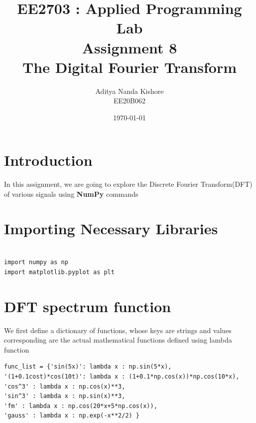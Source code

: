 \documentclass[12pt, a4paper]{report}
\title{\textbf{EE2703 : Applied Programming Lab \\ Assignment 8 \\ The Digital Fourier Transform}}
\author{Aditya Nanda Kishore\\ EE20B062}
\date{\today} %
\begin{document}
		
\maketitle
\section*{Introduction}
In this assignment, we are going to explore the Discrete Fourier Transform(DFT)  of various signals using \textbf{NumPy} commands
\section*{Importing Necessary Libraries}
\begin{Verbatim}

import numpy as np
import matplotlib.pyplot as plt 
\end{Verbatim}

\section*{DFT spectrum function}
We first define a dictionary of functions, whose keys are strings and values corresponding are the actual mathematical functions defined using lambda function

\begin{Verbatim}
func_list = {'sin(5x)': lambda x : np.sin(5*x),
'(1+0.1cost)*cos(10t)': lambda x : (1+0.1*np.cos(x))*np.cos(10*x), 
'cos^3' : lambda x : np.cos(x)**3,
'sin^3' : lambda x : np.sin(x)**3,
'fm' : lambda x : np.cos(20*x+5*np.cos(x)),
'gauss' : lambda x : np.exp(-x**2/2) }
\end{Verbatim}
\end{document}
